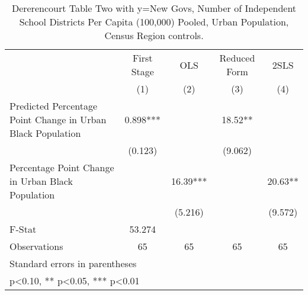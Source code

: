 \begin{table}[htbp]\centering
\def\sym#1{\ifmmode^{#1}\else\(^{#1}\)\fi}
\caption{Dererencourt Table Two with y=New Govs, Number of Independent School Districts Per Capita (100,000) Pooled, Urban Population, Census Region controls.}
\begin{tabular}{l*{4}{c}}
\toprule
                    & First Stage   &         OLS   &Reduced Form   &        2SLS   \\
                    &\multicolumn{1}{c}{(1)}   &\multicolumn{1}{c}{(2)}   &\multicolumn{1}{c}{(3)}   &\multicolumn{1}{c}{(4)}   \\
\midrule
Predicted Percentage Point Change in Urban Black Population&       0.898***&               &       18.52** &               \\
                    &     (0.123)   &               &     (9.062)   &               \\
\addlinespace
Percentage Point Change in Urban Black Population&               &       16.39***&               &       20.63** \\
                    &               &     (5.216)   &               &     (9.572)   \\
\midrule
F-Stat              &      53.274   &               &               &               \\
Observations        &          65   &          65   &          65   &          65   \\
\bottomrule
\multicolumn{5}{l}{\footnotesize Standard errors in parentheses}\\
\multicolumn{5}{l}{\footnotesize * p<0.10, ** p<0.05, *** p<0.01}\\
\end{tabular}
\end{table}
